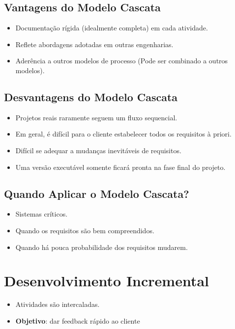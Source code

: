 \documentclass[a4paper, 11pt]{article}
\begin{document}
\subsection{Vantagens do Modelo Cascata}
\begin{itemize}
    \item Documentação rígida (idealmente completa) em cada atividade.
    \item Reflete abordagens adotadas em outras engenharias.
    \item Aderência a outros modelos de processo (Pode ser combinado a outros modelos).
\end{itemize}

\subsection{Desvantagens do Modelo Cascata}
\begin{itemize}
    \item Projetos reais raramente seguem um fluxo sequencial.
    \item Em geral, é difícil para o cliente estabelecer todos os requisitos à priori.
    \item Difícil se adequar a mudanças inevitáveis de requisitos.
    \item Uma versão executável somente ficará pronta na fase final do projeto.
\end{itemize}

\subsection{Quando Aplicar o Modelo Cascata?}
\begin{itemize}
    \item Sistemas críticos.
    \item Quando os requisitos são bem compreendidos.
    \item Quando há pouca probabilidade dos requisitos mudarem.
\end{itemize}
\newpage

\section{Desenvolvimento Incremental}
\begin{itemize}
    \item Atividades são intercaladas.
    \item \textbf{Objetivo}: dar feedback rápido ao cliente
\end{itemize}
\end{document}
